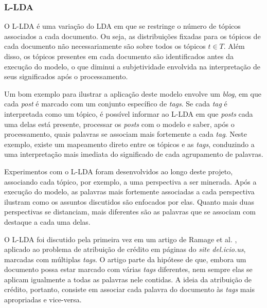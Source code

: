 
\subsubsection{L-LDA}

O L-LDA é uma variação do LDA em que se restringe o número de tópicos associados a cada documento. Ou seja, as distribuições fixadas para os tópicos de cada documento não necessariamente são sobre todos os tópicos \ensuremath{t \in T}. Além disso, os tópicos presentes em cada documento são identificados antes da execução do modelo, o que diminui a subjetividade envolvida na interpretação de seus significados após o processamento. 

Um bom exemplo para ilustrar a aplicação deste modelo envolve um \emph{blog}, em que cada \emph{post} é marcado com um conjunto específico de \emph{tags}. Se cada \emph{tag} é interpretada como um tópico, é possível informar ao L-LDA em que \emph{posts} cada uma delas está presente, processar os \emph{posts} com o modelo e saber, após o processamento, quais palavras se associam mais fortemente a cada \emph{tag}. Neste exemplo, existe um mapeamento direto entre os tópicos e as \emph{tags}, conduzindo a uma interpretação mais imediata do significado de cada agrupamento de palavras.

Experimentos com o L-LDA foram desenvolvidos ao longo deste projeto, associando cada tópico, por exemplo, a uma perspectiva a ser minerada. Após a execução do modelo, as palavras mais fortemente associadas a cada perspectiva ilustram como os assuntos discutidos são enfocados por elas. Quanto mais duas perspectivas se distanciam, mais diferentes são as palavras que se associam com destaque a cada uma delas.

O L-LDA foi discutido pela primeira vez em um artigo de Ramage et al. \cite{llda}, aplicado ao problema de atribuição de crédito em páginas do \emph{site del.icio.us}, marcadas com múltiplas \emph{tags}. O artigo parte da hipótese de que, embora um documento possa estar marcado com várias \emph{tags} diferentes, nem sempre elas se aplicam igualmente a todas as palavras nele contidas. A ideia da atribuição de crédito, portanto, consiste em associar cada palavra do documento às \emph{tags} mais apropriadas e vice-versa. 

